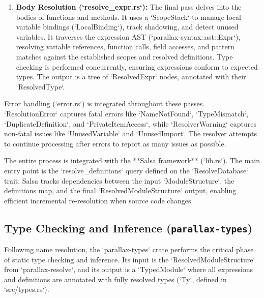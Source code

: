 \begin{enumerate}
    \item \textbf{Body Resolution (`resolve_expr.rs`):} The final pass delves into the bodies of functions and methods. It uses a `ScopeStack` to manage local variable bindings (`LocalBinding`), track shadowing, and detect unused variables. It traverses the expression AST (`parallax-syntax::ast::Expr`), resolving variable references, function calls, field accesses, and pattern matches against the established scopes and resolved definitions. Type checking is performed concurrently, ensuring expressions conform to expected types. The output is a tree of `ResolvedExpr` nodes, annotated with their `ResolvedType`.
\end{enumerate}

Error handling (`error.rs`) is integrated throughout these passes. `ResolutionError` captures fatal errors like `NameNotFound`, `TypeMismatch`, `DuplicateDefinition`, and `PrivateItemAccess`, while `ResolverWarning` captures non-fatal issues like `UnusedVariable` and `UnusedImport`. The resolver attempts to continue processing after errors to report as many issues as possible.

The entire process is integrated with the **Salsa framework** (`lib.rs`). The main entry point is the `resolve_definitions` query defined on the `ResolveDatabase` trait. Salsa tracks dependencies between the input `ModuleStructure`, the definitions map, and the final `ResolvedModuleStructure` output, enabling efficient incremental re-resolution when source code changes.

\subsection{Type Checking and Inference (\texttt{parallax-types})} %
Following name resolution, the `parallax-types` crate performs the critical phase of static type checking and inference. Its input is the `ResolvedModuleStructure` from `parallax-resolve`, and its output is a `TypedModule` where all expressions and definitions are annotated with fully resolved types (`Ty`, defined in `src/types.rs`).

